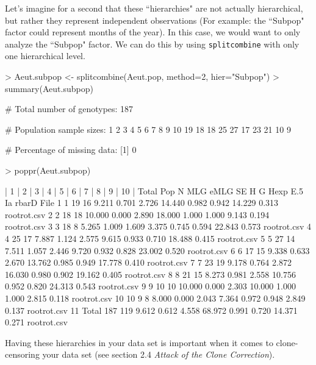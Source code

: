 \documentclass[letterpaper]{article}
\begin{document}
Let's imagine for a second that these ``hierarchies" are not actually hierarchical, but rather they represent independent observations (For example: the ``Subpop" factor could represent months of the year). In this case, we would want to only analyze the ``Subpop" factor. We can do this by using \texttt{splitcombine} with only one hierarchical level.
\begin{Schunk}
\begin{Sinput}
> Aeut.subpop <- splitcombine(Aeut.pop, method=2, hier="Subpop")
> summary(Aeut.subpop)
\end{Sinput}
\begin{Soutput}
 # Total number of genotypes:  187 

 # Population sample sizes:  
 1  2  3  4  5  6  7  8  9 10 
19 18 18 25 27 17 23 21 10  9 

 # Percentage of missing data:  
[1] 0
\end{Soutput}
\begin{Sinput}
> poppr(Aeut.subpop)
\end{Sinput}
\begin{Soutput}
| 1 
| 2 
| 3 
| 4 
| 5 
| 6 
| 7 
| 8 
| 9 
| 10 
| Total 
     Pop   N MLG   eMLG    SE     H      G  Hexp   E.5     Ia rbarD        File
1      1  19  16  9.211 0.701 2.726 14.440 0.982 0.942 14.229 0.313 rootrot.csv
2      2  18  18 10.000 0.000 2.890 18.000 1.000 1.000  9.143 0.194 rootrot.csv
3      3  18   8  5.265 1.009 1.609  3.375 0.745 0.594 22.843 0.573 rootrot.csv
4      4  25  17  7.887 1.124 2.575  9.615 0.933 0.710 18.488 0.415 rootrot.csv
5      5  27  14  7.511 1.057 2.446  9.720 0.932 0.828 23.002 0.520 rootrot.csv
6      6  17  15  9.338 0.633 2.670 13.762 0.985 0.949 17.778 0.410 rootrot.csv
7      7  23  19  9.178 0.764 2.872 16.030 0.980 0.902 19.162 0.405 rootrot.csv
8      8  21  15  8.273 0.981 2.558 10.756 0.952 0.820 24.313 0.543 rootrot.csv
9      9  10  10 10.000 0.000 2.303 10.000 1.000 1.000  2.815 0.118 rootrot.csv
10    10   9   8  8.000 0.000 2.043  7.364 0.972 0.948  2.849 0.137 rootrot.csv
11 Total 187 119  9.612 0.612 4.558 68.972 0.991 0.720 14.371 0.271 rootrot.csv
\end{Soutput}
\end{Schunk}
Having these hierarchies in your data set is important when it comes to clone-censoring your data set (see section 2.4 \textit{Attack of the Clone Correction}).
\end{document}

